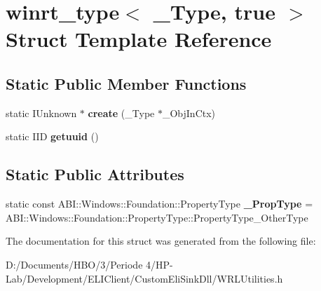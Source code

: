 \hypertarget{structwinrt__type_3_01___type_00_01true_01_4}{}\section{winrt\+\_\+type$<$ \+\_\+\+Type, true $>$ Struct Template Reference}
\label{structwinrt__type_3_01___type_00_01true_01_4}
\subsection*{Static Public Member Functions}
\begin{DoxyCompactItemize}
\item 
\mbox{\label{structwinrt__type_3_01___type_00_01true_01_4_a28dae58928b84293f35089e0953b37c3}} 
static I\+Unknown $\ast$ {\bfseries create} (\+\_\+\+Type $\ast$\+\_\+\+Obj\+In\+Ctx)
\item 
\mbox{\label{structwinrt__type_3_01___type_00_01true_01_4_afd05432a25dddf20b7ab75597586056b}} 
static I\+ID {\bfseries getuuid} ()
\end{DoxyCompactItemize}
\subsection*{Static Public Attributes}
\begin{DoxyCompactItemize}
\item 
\mbox{\label{structwinrt__type_3_01___type_00_01true_01_4_a08f2bf20d43005589dae5a071ad35548}} 
static const A\+B\+I\+::\+Windows\+::\+Foundation\+::\+Property\+Type {\bfseries \+\_\+\+Prop\+Type} = A\+B\+I\+::\+Windows\+::\+Foundation\+::\+Property\+Type\+::\+Property\+Type\+\_\+\+Other\+Type
\end{DoxyCompactItemize}


The documentation for this struct was generated from the following file\+:\begin{DoxyCompactItemize}
\item 
D\+:/\+Documents/\+H\+B\+O/3/\+Periode 4/\+H\+P-\/\+Lab/\+Development/\+E\+L\+I\+Client/\+Custom\+Eli\+Sink\+Dll/W\+R\+L\+Utilities.\+h\end{DoxyCompactItemize}
